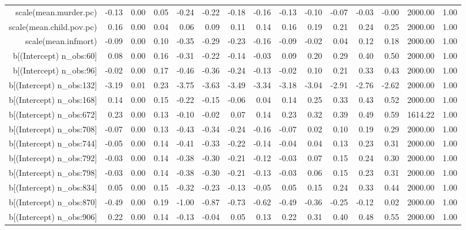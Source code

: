 \begin{table}[ht]
\begin{tabular}{rrrrrrrrrrrrrrr}
  scale(mean.murder.pc) & -0.13 & 0.00 & 0.05 & -0.24 & -0.22 & -0.18 & -0.16 & -0.13 & -0.10 & -0.07 & -0.03 & -0.00 & 2000.00 & 1.00 \\ 
  scale(mean.child.pov.pc) & 0.16 & 0.00 & 0.04 & 0.06 & 0.09 & 0.11 & 0.14 & 0.16 & 0.19 & 0.21 & 0.24 & 0.25 & 2000.00 & 1.00 \\ 
  scale(mean.infmort) & -0.09 & 0.00 & 0.10 & -0.35 & -0.29 & -0.23 & -0.16 & -0.09 & -0.02 & 0.04 & 0.12 & 0.18 & 2000.00 & 1.00 \\ 
  b[(Intercept) n\_obs:60] & 0.08 & 0.00 & 0.16 & -0.31 & -0.22 & -0.14 & -0.03 & 0.09 & 0.20 & 0.29 & 0.40 & 0.50 & 2000.00 & 1.00 \\ 
  b[(Intercept) n\_obs:96] & -0.02 & 0.00 & 0.17 & -0.46 & -0.36 & -0.24 & -0.13 & -0.02 & 0.10 & 0.21 & 0.33 & 0.43 & 2000.00 & 1.00 \\ 
  b[(Intercept) n\_obs:132] & -3.19 & 0.01 & 0.23 & -3.75 & -3.63 & -3.49 & -3.34 & -3.18 & -3.04 & -2.91 & -2.76 & -2.62 & 2000.00 & 1.00 \\ 
  b[(Intercept) n\_obs:168] & 0.14 & 0.00 & 0.15 & -0.22 & -0.15 & -0.06 & 0.04 & 0.14 & 0.25 & 0.33 & 0.43 & 0.52 & 2000.00 & 1.00 \\ 
  b[(Intercept) n\_obs:672] & 0.23 & 0.00 & 0.13 & -0.10 & -0.02 & 0.07 & 0.14 & 0.23 & 0.32 & 0.39 & 0.49 & 0.59 & 1614.22 & 1.00 \\ 
  b[(Intercept) n\_obs:708] & -0.07 & 0.00 & 0.13 & -0.43 & -0.34 & -0.24 & -0.16 & -0.07 & 0.02 & 0.10 & 0.19 & 0.29 & 2000.00 & 1.00 \\ 
  b[(Intercept) n\_obs:744] & -0.05 & 0.00 & 0.14 & -0.41 & -0.33 & -0.22 & -0.14 & -0.04 & 0.04 & 0.13 & 0.23 & 0.31 & 2000.00 & 1.00 \\ 
  b[(Intercept) n\_obs:792] & -0.03 & 0.00 & 0.14 & -0.38 & -0.30 & -0.21 & -0.12 & -0.03 & 0.07 & 0.15 & 0.24 & 0.30 & 2000.00 & 1.00 \\ 
  b[(Intercept) n\_obs:798] & -0.03 & 0.00 & 0.14 & -0.38 & -0.30 & -0.21 & -0.13 & -0.03 & 0.06 & 0.15 & 0.23 & 0.31 & 2000.00 & 1.00 \\ 
  b[(Intercept) n\_obs:834] & 0.05 & 0.00 & 0.15 & -0.32 & -0.23 & -0.13 & -0.05 & 0.05 & 0.15 & 0.24 & 0.33 & 0.44 & 2000.00 & 1.00 \\ 
  b[(Intercept) n\_obs:870] & -0.49 & 0.00 & 0.19 & -1.00 & -0.87 & -0.73 & -0.62 & -0.49 & -0.36 & -0.25 & -0.12 & 0.02 & 2000.00 & 1.00 \\ 
  b[(Intercept) n\_obs:906] & 0.22 & 0.00 & 0.14 & -0.13 & -0.04 & 0.05 & 0.13 & 0.22 & 0.31 & 0.40 & 0.48 & 0.55 & 2000.00 & 1.00 \\ 

\end{tabular}
\end{table}
